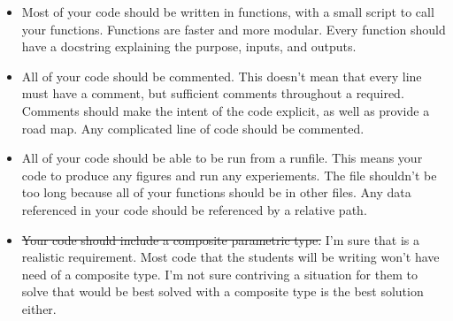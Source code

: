 \documentclass[12pt]{article}
\begin{document}
\begin{enumerate}
		\begin{itemize}
			\item Most of your code should be written in functions, with a small script to call your functions. Functions are faster and more modular.  Every function should have a docstring explaining the purpose, inputs, and outputs. 
			\item All of your code should be commented. This doesn't mean that every line must have a comment, but sufficient comments throughout a required. Comments should make the intent of the code explicit, as well as provide a road map. Any complicated line of code should be commented. 
			\item All of your code should be able to be run from a runfile. This means your code to produce any figures and run any experiements. The file shouldn't be too long because all of your functions should be in other files. Any data referenced in your code should be referenced by a relative path. 
			\item \st{Your code should include a composite parametric type. } I'm sure that is a realistic requirement. Most code that the students will be writing won't have need of a composite type. I'm not sure contriving a situation for them to solve that would be best solved with a composite type is the best solution either. 
		\end{itemize}
	\end{enumerate}
	
	\bigskip
	

	
	
\end{document}
